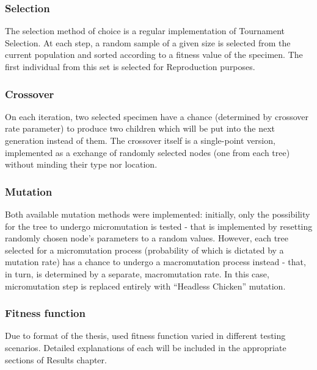 \subsubsection{Selection}
The selection method of choice is a regular implementation of Tournament Selection. At each step, a random sample of a given size is selected from the current population and sorted according to a fitness value of the specimen. The first individual from this set is selected for Reproduction purposes.
\subsubsection{Crossover}
On each iteration, two selected specimen have a chance (determined by crossover rate parameter) to produce two children which will be put into the next generation instead of them. The crossover itself is a single-point version, implemented as a exchange of randomly selected nodes (one from each tree) without minding their type nor location.
\subsubsection{Mutation}
Both available mutation methods were implemented: initially, only the possibility for the tree to undergo micromutation is tested - that is implemented by resetting randomly chosen node's parameters to a random values. However, each tree selected for a micromutation process (probability of which is dictated by a mutation rate) has a chance to undergo a macromutation process instead - that, in turn, is determined by a separate, macromutation rate. In this case, micromutation step is replaced entirely with ``Headless Chicken'' mutation.
\subsubsection{Fitness function}
Due to format of the thesis, used fitness function varied in different testing scenarios. Detailed explanations of each will be included in the appropriate sections of Results chapter.
